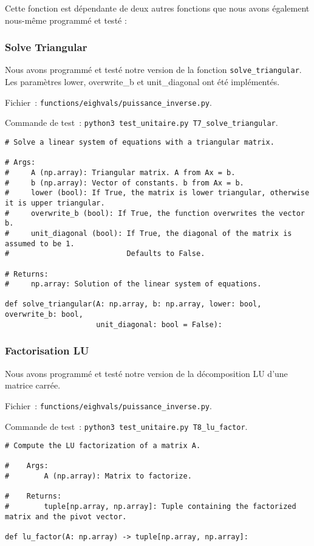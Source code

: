 \documentclass{article}
\begin{document}
Cette fonction est dépendante de deux autres fonctions que nous avons également nous-même programmé et testé :

\subsubsection{Solve Triangular}

Nous avons programmé et testé notre version de la fonction \texttt{solve\_triangular}. \\
Les paramètres lower, overwrite\_b et unit\_diagonal ont été implémentés.

Fichier~: \texttt{functions/eighvals/puissance\_inverse.py}.

Commande de test~: \texttt{python3 test\_unitaire.py T7\_solve\_triangular}.

\begin{small}
\begin{verbatim}
# Solve a linear system of equations with a triangular matrix.

# Args:
#     A (np.array): Triangular matrix. A from Ax = b.
#     b (np.array): Vector of constants. b from Ax = b.
#     lower (bool): If True, the matrix is lower triangular, otherwise it is upper triangular.
#     overwrite_b (bool): If True, the function overwrites the vector b.
#     unit_diagonal (bool): If True, the diagonal of the matrix is assumed to be 1. 
#                           Defaults to False.

# Returns:
#     np.array: Solution of the linear system of equations.

def solve_triangular(A: np.array, b: np.array, lower: bool, overwrite_b: bool, 
                     unit_diagonal: bool = False):
\end{verbatim}
\end{small}

\subsubsection{Factorisation LU}

Nous avons programmé et testé notre version de la décomposition LU d'une matrice carrée.

Fichier~: \texttt{functions/eighvals/puissance\_inverse.py}.

Commande de test~: \texttt{python3 test\_unitaire.py T8\_lu\_factor}.

\begin{small}
\begin{verbatim}
# Compute the LU factorization of a matrix A.

#    Args:
#        A (np.array): Matrix to factorize.

#    Returns:
#        tuple[np.array, np.array]: Tuple containing the factorized matrix and the pivot vector.

def lu_factor(A: np.array) -> tuple[np.array, np.array]:
\end{verbatim}
\end{small}
\end{document}

